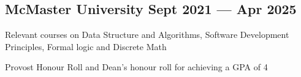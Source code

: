 
\subsection{{McMaster University \hfill Sept 2021 --- Apr 2025}}
\begin{zitemize}
    \item Relevant courses on \hspace{0.05cm}Data Structure and Algorithms, Software Development Principles, Formal logic and Discrete Math
    \item Provost Honour Roll and Dean's honour roll for achieving a GPA of 4

\end{zitemize}

